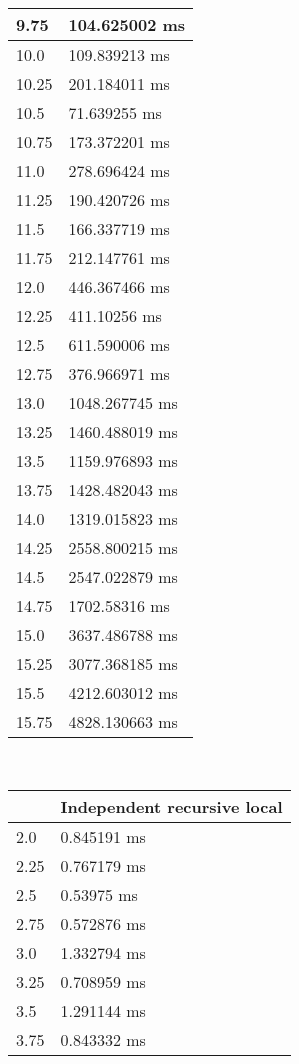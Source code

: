 \begin{multicols}{2}
\begin{tabular}{|l|l|}
		9.75 & 104.625002 ms \\ \hline
		10.0 & 109.839213 ms \\ \hline
		10.25 & 201.184011 ms \\ \hline
		10.5 & 71.639255 ms \\ \hline
		10.75 & 173.372201 ms \\ \hline
		11.0 & 278.696424 ms \\ \hline
		11.25 & 190.420726 ms \\ \hline
		11.5 & 166.337719 ms \\ \hline
		11.75 & 212.147761 ms \\ \hline
		12.0 & 446.367466 ms \\ \hline
		12.25 & 411.10256 ms \\ \hline
		12.5 & 611.590006 ms \\ \hline
		12.75 & 376.966971 ms \\ \hline
		13.0 & 1048.267745 ms \\ \hline
		13.25 & 1460.488019 ms \\ \hline
		13.5 & 1159.976893 ms \\ \hline
		13.75 & 1428.482043 ms \\ \hline
		14.0 & 1319.015823 ms \\ \hline
		14.25 & 2558.800215 ms \\ \hline
		14.5 & 2547.022879 ms \\ \hline
		14.75 & 1702.58316 ms \\ \hline
		15.0 & 3637.486788 ms \\ \hline
		15.25 & 3077.368185 ms \\ \hline
		15.5 & 4212.603012 ms \\ \hline
		15.75 & 4828.130663 ms \\ \hline
	\end{tabular}\\
	\begin{tabular}{|l|l|}
		\hline
		& Independent recursive local \\ \hline
		2.0 & 0.845191 ms \\ \hline
		2.25 & 0.767179 ms \\ \hline
		2.5 & 0.53975 ms \\ \hline
		2.75 & 0.572876 ms \\ \hline
		3.0 & 1.332794 ms \\ \hline
		3.25 & 0.708959 ms \\ \hline
		3.5 & 1.291144 ms \\ \hline
		3.75 & 0.843332 ms \\ \hline

\end{tabular}
\end{multicols}

